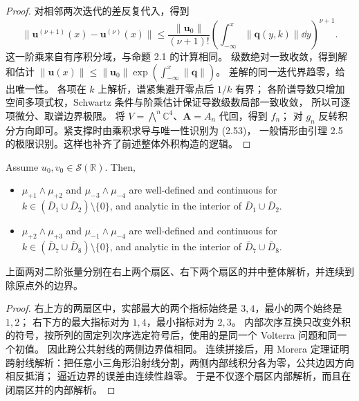 \begin{proof}
对相邻两次迭代的差反复代入，得到
\[
\|\mathbf u^{(\nu+1)}(x)-\mathbf u^{(\nu)}(x)\|
\le\dfrac{\|\mathbf u_0\|}{(\nu+1)!}
\left(\int_{-\infty}^x\|\mathbf q(y,k)\|\dd y\right)^{\nu+1}.
\]
这一阶乘来自有序积分域，与命题 2.1 的计算相同。
级数绝对一致收敛，得到解和估计
$\displaystyle \|\mathbf u(x)\|\le\|\mathbf u_0\|\exp(\int_{-\infty}^x\|\mathbf q\|)$。
差解的同一迭代界趋零，给出唯一性。
各项在 $k$ 上解析，谱紧集避开零点后 $1/k$ 有界；
各阶谱导数只增加空间多项式权，Schwartz 条件与阶乘估计保证导数级数局部一致收敛，
所以可逐项微分、取谱边界极限。
将 $V=\bigwedge^n\mathbb C^4$、$\mathbf A=A_n$ 代回，得到 $f_n$；
对 $g_n$ 反转积分方向即可。紧支撑时由乘积求导与唯一性识别为 (2.53)，
一般情形由引理 2.5 的极限识别。这样也补齐了前述整体外积构造的逻辑。
\end{proof}
\begin{note}
\end{note}
\begin{papercorollaryen}\label{cor:2.1}
Assume $u_0,v_0\in\mathcal S(\mathbb R)$. Then,
\begin{itemize}
\item $\mu_{+1}\wedge\mu_{+2}$ and $\mu_{-3}\wedge\mu_{-4}$ are well-defined and continuous for $k\in(\overline D_1\cup\overline D_2)\setminus\{0\}$, and analytic in the interior of $\overline D_1\cup\overline D_2$.
\item $\mu_{+2}\wedge\mu_{+3}$ and $\mu_{-1}\wedge\mu_{-4}$ are well-defined and continuous for $k\in(\overline D_7\cup\overline D_8)\setminus\{0\}$, and analytic in the interior of $\overline D_7\cup\overline D_8$.
\end{itemize}
\end{papercorollaryen}
\begin{papercorollarycn*}
上面两对二阶张量分别在右上两个扇区、右下两个扇区的并中整体解析，并连续到除原点外的边界。
\end{papercorollarycn*}
\begin{proof}
右上方的两扇区中，实部最大的两个指标始终是 $3,4$，最小的两个始终是 $1,2$；
右下方的最大指标对为 $1,4$，最小指标对为 $2,3$。
内部次序互换只改变外积的符号，按所列的固定列次序选定符号后，使用的是同一个 Volterra 问题和同一个初值。
因此跨公共射线的两侧边界值相同。
连续拼接后，用 Morera 定理证明跨射线解析：把任意小三角形沿射线分割，两侧内部线积分各为零，公共边因方向相反抵消；
逼近边界的误差由连续性趋零。
于是不仅逐个扇区内部解析，而且在闭扇区并的内部解析。
\end{proof}

